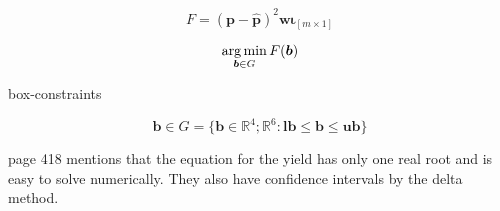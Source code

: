 \begin{equation}\label{eq:objfct-nelson}
	F=\left(\bm{p} - \bm{\hat{p}}\right)^2 \bm{w}\bm{\iota}_{\left[m \times 1\right]}
\end{equation}

\begin{equation}
  \label{eq:objfct-nelsonmin}
  \operatorname*{arg\,min}_{\bm{b} \in G} F(\bm{b})
\end{equation}

box-constraints

	
	 $$ \bm{b} \in G =   \{ \bm{b} \in \mathbb{R}^4 ; \mathbb{R}^6 : \mathbf{lb} \leq \bm{b} \leq \mathbf{ub}  \}$$



\cite{Soederlind1997} page 418 mentions that the equation for the yield has only one real root and is easy to solve numerically. They also have confidence intervals by the delta method.

